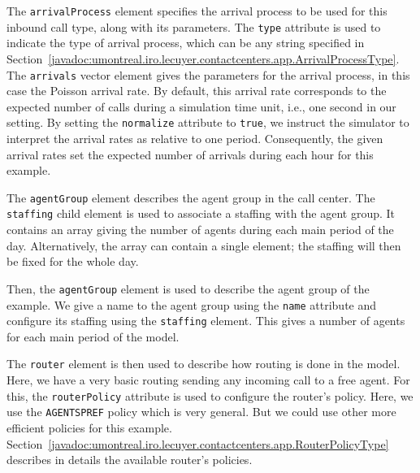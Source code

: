 The \texttt{arrival\-Process} element %
specifies the arrival process to
be used for this inbound call type, along with its parameters.
The \texttt{type} attribute is used to indicate the type of
arrival process, which can be any string specified in
Section~\ref{javadoc:umontreal.iro.lecuyer.contactcenters.app.ArrivalProcessType}.
The \texttt{arrivals} vector element gives the parameters for the
arrival process, in this case the Poisson arrival rate.
By default,
this arrival rate corresponds to the expected number of calls during a
simulation time unit, i.e., one second in our setting.
By setting the \texttt{normalize} attribute to \texttt{true}, we
instruct the simulator to interpret the arrival rates as relative to
one period.  Consequently, the given arrival rates set the expected
number of arrivals during each hour for this example.

The
\texttt{agent\-Group} element %
describes the agent group in the call
center.
The \texttt{staffing} child element is used to associate a staffing
with the agent group.
It contains an array giving the number of agents during each main
period of the day.
Alternatively, the array can contain a single element; the staffing
will then be fixed for the whole day.

Then, the \texttt{agent\-Group} element is used to describe the agent
group of the example.
We give a name to the agent group using the \texttt{name} attribute
and configure its staffing using the \texttt{staffing} element.
This gives a number of agents for each main period of the model.

The \texttt{router} element is then used to describe how routing is
done in the model.
Here, we have a very basic routing sending any incoming call to a free agent.
For this, the \texttt{router\-Policy} attribute is used to configure the
router's policy. Here, we use the \texttt{AGENTSPREF} policy which is
very general.
But we could use other more efficient policies for this example.
Section~\ref{javadoc:umontreal.iro.lecuyer.contactcenters.app.RouterPolicyType}
describes in details the
available router's policies.

